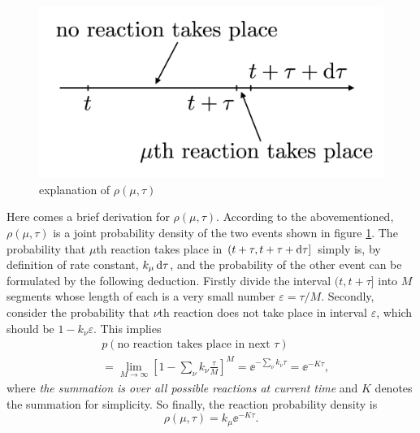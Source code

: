 		\begin{figure}
		\centering
		\includegraphics[scale=0.24]{img/reaction_prob.png}
		\caption{explanation of $\rho(\mu,\tau)$ }
		\label{img:reaction_prob}
		\end{figure}

		Here comes a brief derivation for $\rho(\mu,\tau)$. According to the abovementioned, $\rho(\mu,\tau)$ is a joint probability density of the two events shown in figure \ref{img:reaction_prob}. The probability that $\mu$th reaction takes place in $(t+\tau, t+\tau + \operatorname{d\!} \tau]$ simply is, by definition of rate constant, $k_\mu \operatorname{d\!} \tau$, and the probability of the other event can be formulated by the following deduction. Firstly divide the interval $(t,t+\tau]$ into $M$ segments whose length of each is a very small number $\varepsilon=\tau / M$. Secondly, consider the probability that $\nu$th reaction does not take place in interval $\varepsilon$, which should be $1-k_\nu\varepsilon$. This implies
		\begin{equation}
			\begin{aligned}
			&p(\text{no reaction takes place in next $\tau$}) \\&=
				\lim_{M\to\infty} \left[ 1-\sum_{\nu}k_\nu\frac{\tau}{M} \right]^{M} 
				=\ee^{-\sum_\nu k_\nu \tau} = \ee^{-K\tau},
			\end{aligned}
			\label{eq:possion}
		\end{equation}
		where \textit{the summation is over all possible reactions at current time} and $K$ denotes the summation for simplicity. So finally, the reaction probability density is
		\begin{equation}
			\rho(\mu,\tau) = k_\mu \ee^{-K\tau}.
		\end{equation}

